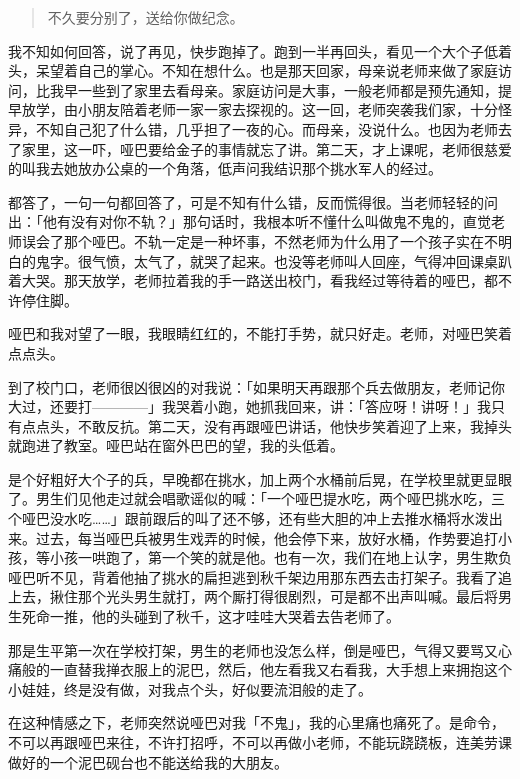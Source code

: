 \documentclass[UTF8]{ctexart}
\begin{document}
\begin{quotation}
不久要分别了，送给你做纪念。
\end{quotation}

我不知如何回答，说了再见，快步跑掉了。跑到一半再回头，看见一个大个子低着头，呆望着自己的掌心。不知在想什么。也是那天回家，母亲说老师来做了家庭访问，比我早一些到了家里去看母亲。家庭访问是大事，一般老师都是预先通知，提早放学，由小朋友陪着老师一家一家去探视的。这一回，老师突袭我们家，十分怪异，不知自己犯了什么错，几乎担了一夜的心。而母亲，没说什么。也因为老师去了家里，这一吓，哑巴要给金子的事情就忘了讲。第二天，才上课呢，老师很慈爱的叫我去她放办公桌的一个角落，低声问我结识那个挑水军人的经过。

都答了，一句一句都回答了，可是不知有什么错，反而慌得很。当老师轻轻的问出：「他有没有对你不轨？」那句话时，我根本听不懂什么叫做鬼不鬼的，直觉老师误会了那个哑巴。不轨一定是一种坏事，不然老师为什么用了一个孩子实在不明白的鬼字。很气愤，太气了，就哭了起来。也没等老师叫人回座，气得冲回课桌趴着大哭。那天放学，老师拉着我的手一路送出校门，看我经过等待着的哑巴，都不许停住脚。

哑巴和我对望了一眼，我眼睛红红的，不能打手势，就只好走。老师，对哑巴笑着点点头。

到了校门口，老师很凶很凶的对我说：「如果明天再跟那个兵去做朋友，老师记你大过，还要打————」我哭着小跑，她抓我回来，讲：「答应呀！讲呀！」我只有点点头，不敢反抗。第二天，没有再跟哑巴讲话，他快步笑着迎了上来，我掉头就跑进了教室。哑巴站在窗外巴巴的望，我的头低着。

是个好粗好大个子的兵，早晚都在挑水，加上两个水桶前后晃，在学校里就更显眼了。男生们见他走过就会唱歌谣似的喊：「一个哑巴提水吃，两个哑巴挑水吃，三个哑巴没水吃……」跟前跟后的叫了还不够，还有些大胆的冲上去推水桶将水泼出来。过去，每当哑巴兵被男生戏弄的时候，他会停下来，放好水桶，作势要追打小孩，等小孩一哄跑了，第一个笑的就是他。也有一次，我们在地上认字，男生欺负哑巴听不见，背着他抽了挑水的扁担逃到秋千架边用那东西去击打架子。我看了追上去，揪住那个光头男生就打，两个厮打得很剧烈，可是都不出声叫喊。最后将男生死命一推，他的头碰到了秋千，这才哇哇大哭着去告老师了。

那是生平第一次在学校打架，男生的老师也没怎么样，倒是哑巴，气得又要骂又心痛般的一直替我掸衣服上的泥巴，然后，他左看我又右看我，大手想上来拥抱这个小娃娃，终是没有做，对我点个头，好似要流泪般的走了。

在这种情感之下，老师突然说哑巴对我「不鬼」，我的心里痛也痛死了。是命令，不可以再跟哑巴来往，不许打招呼，不可以再做小老师，不能玩跷跷板，连美劳课做好的一个泥巴砚台也不能送给我的大朋友。
\end{document}
